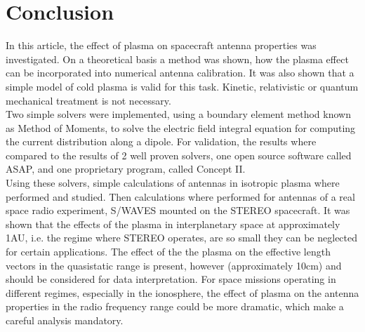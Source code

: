 \documentclass[a4paper,11pt]{article}
\begin{document}
\section{Conclusion}
In this article, the effect of plasma on spacecraft antenna properties was investigated. On a theoretical basis a method was shown, how the plasma effect can be incorporated into numerical antenna calibration. It was also shown that a simple model of cold plasma is valid for this task. Kinetic, relativistic or quantum mechanical treatment is not necessary.\\

Two simple solvers were implemented, using a boundary element method known as Method of Moments, to solve the electric field integral equation for computing the current distribution along a dipole. For validation, the results where compared to the results of 2 well proven solvers, one open source software called ASAP, and one proprietary program, called Concept II.\\

Using these solvers, simple calculations of antennas in isotropic plasma where performed and studied. Then calculations where performed for antennas of a real space radio experiment, S/WAVES mounted on the STEREO spacecraft. It was shown that the effects of the plasma in interplanetary space at approximately 1AU, i.e. the regime where STEREO operates, are so small they can be neglected for certain applications. The effect of the the plasma on the effective length vectors in the quasistatic range is present, however (approximately 10cm) and should be considered for data interpretation. For space missions operating in different regimes, especially in the ionosphere, the effect of plasma on the antenna properties in the radio frequency range could be more dramatic, which make a careful analysis mandatory.\\





\end{document}
